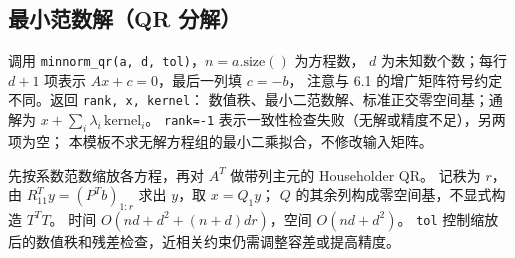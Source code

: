 				\subsection{最小范数解（QR 分解）}
					调用 \texttt{minnorm\_qr(a, d, tol)}，$n=a.\mathrm{size}()$ 为方程数，
					$d$ 为未知数个数；每行 $d+1$ 项表示 $Ax+c=0$，最后一列填 $c=-b$，
					注意与 6.1 的增广矩阵符号约定不同。返回 \texttt{rank, x, kernel}：
					数值秩、最小二范数解、标准正交零空间基；通解为
					$x+\sum_i\lambda_i\,\mathrm{kernel}_i$。
					\texttt{rank=-1} 表示一致性检查失败（无解或精度不足），另两项为空；
					本模板不求无解方程组的最小二乘拟合，不修改输入矩阵。

					先按系数范数缩放各方程，再对 $A^T$ 做带列主元的 Householder QR。
					记秩为 $r$，由 $R_{11}^Ty=(P^Tb)_{1:r}$ 求出 $y$，取 $x=Q_1y$；
					$Q$ 的其余列构成零空间基，不显式构造 $T^TT$。
					时间 $O(nd+d^2+(n+d)dr)$，空间 $O(nd+d^2)$。
					\texttt{tol} 控制缩放后的数值秩和残差检查，近相关约束仍需调整容差或提高精度。
					\inputminted{cpp}{sections/LinearAlgebra/assets/Geometry/minnorm_gauss.cpp}

